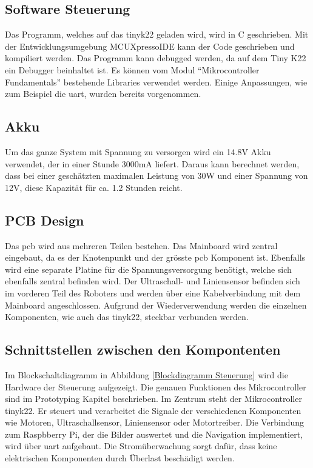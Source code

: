 \subsection{Software Steuerung}


Das Programm, welches auf das \gls{tinyk22} geladen wird, wird in C geschrieben. Mit der Entwicklungsumgebung MCUXpressoIDE kann der Code geschrieben und kompiliert werden. Das Programm kann debugged werden, da auf dem Tiny K22 ein Debugger beinhaltet ist. Es können vom Modul ``Mikrocontroller Fundamentals'' bestehende Libraries verwendet werden. Einige Anpassungen, wie zum Beispiel die \acrshort{uart}, wurden bereits vorgenommen.

\subsection{Akku}

Um das ganze System mit Spannung zu versorgen wird ein 14.8V Akku verwendet, der in einer Stunde 3000mA liefert. Daraus kann berechnet werden, dass bei einer geschätzten maximalen Leistung von 30W und einer Spannung von 12V, diese Kapazität für ca. 1.2 Stunden reicht.  

\subsection{PCB Design}

Das \acrshort{pcb} wird aus mehreren Teilen bestehen. Das Mainboard wird zentral eingebaut, da es der Knotenpunkt und der grösste \acrshort{pcb} Komponent ist. Ebenfalls wird eine separate Platine für die Spannungsversorgung benötigt, welche sich ebenfalls zentral befinden wird. Der Ultraschall- und Liniensensor befinden sich im vorderen Teil des Roboters und werden über eine Kabelverbindung mit dem Mainboard angeschlossen. Aufgrund der Wiederverwendung werden die einzelnen Komponenten, wie auch das \gls{tinyk22}, steckbar verbunden werden.

\newpage

\subsection{Schnittstellen zwischen den Kompontenten}

Im Blockschaltdiagramm in Abbildung \ref{Blockdiagramm Steuerung} wird die Hardware der Steuerung aufgezeigt. Die genauen Funktionen des Mikrocontroller sind im Prototyping Kapitel  beschrieben. Im Zentrum steht der Mikrocontroller \gls{tinyk22}.
Er steuert und verarbeitet die Signale der verschiedenen Komponenten wie Motoren, Ultraschallsensor, Liniensensor oder Motortreiber. Die Verbindung zum Raspbberry Pi, der die Bilder auswertet und die Navigation implementiert, wird über \acrfull{uart} aufgebaut. Die Stromüberwachung sorgt dafür, dass keine elektrischen Komponenten durch Überlast beschädigt werden.


